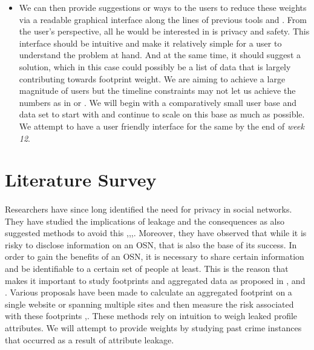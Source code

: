 \documentclass[11pt]{article}
\begin{document}
\begin{itemize}
   \item We can then provide suggestions or ways to the users to reduce these weights via a readable graphical interface along the lines of previous tools \cite{privaware} and \cite{privometer}. From the user’s perspective, all he would be interested in is privacy and safety. This interface should be intuitive and make it relatively simple for a user to understand the problem at hand. And at the same time, it should suggest a solution, which in this case could possibly be a list of data that is largely contributing towards footprint weight. We are aiming to achieve a large magnitude of users but the timeline constraints may not let us achieve the numbers as in \cite{emergingthreat} or \cite{privacypaper}. We will begin with a comparatively small user base and data set to start with and continue to scale on this base as much as possible. We attempt to have a user friendly interface for the same by the end of {\sl week 12}.
   \end{itemize}

\section{Literature Survey}

\paragraph{}
Researchers have since long identified the need for privacy in social networks. They have studied the implications of leakage and the consequences as also suggested methods to avoid this \cite{emergingthreat},\cite{inforevelation},\cite{privacypaper},\cite{undermining}. Moreover, they have observed that while it is risky to disclose information on an OSN, that is also the base of its success. In order to gain the benefits of an OSN, it is necessary to share certain information and be identifiable to a certain set of people at least. This is the reason that makes it important to study footprints and aggregated data as proposed in \cite{emergingthreat},\cite{leakage} and \cite{paas}. Various proposals have been made to calculate an aggregated footprint on a single website or spanning multiple sites and then measure the risk associated with these footprints \cite{socialgraph},\cite{framework}. These methods rely on intuition to weigh leaked profile attributes. We will attempt to provide weights by studying past crime instances that occurred as a result of attribute leakage.
\end{document}
